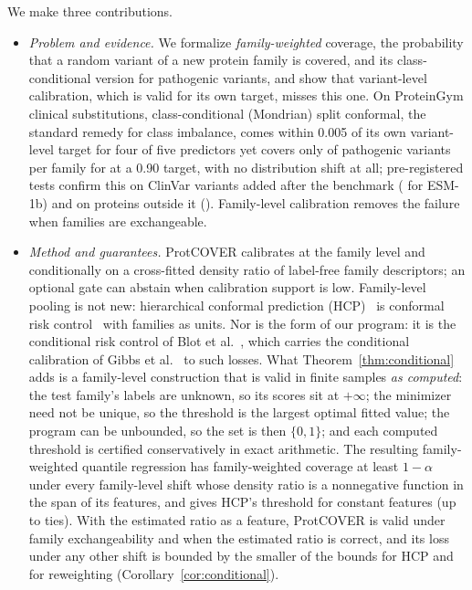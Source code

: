We make three contributions.
\begin{itemize}
\item \emph{Problem and evidence.} We formalize \emph{family-weighted} coverage, the probability that a random variant of a new protein family is covered, and its class-conditional version for pathogenic variants, and show that variant-level calibration, which is valid for its own target, misses this one. On ProteinGym clinical substitutions, class-conditional (Mondrian) split conformal, the standard remedy for class imbalance, comes within 0.005 of its own variant-level target for four of five predictors yet covers only \sOneBtwoPath{} of pathogenic variants per family for \sOneBtwoNBelow{} at a 0.90 target, with no distribution shift at all; pre-registered tests confirm this on ClinVar variants added after the benchmark (\extBtwoPath{} for ESM-1b) and on proteins outside it (\unsBtwoPath{}). Family-level calibration removes the failure when families are exchangeable.
\item \emph{Method and guarantees.} ProtCOVER calibrates at the family level and conditionally on a cross-fitted density ratio of label-free family descriptors; an optional gate can abstain when calibration support is low. Family-level pooling is not new: hierarchical conformal prediction (HCP)~\cite{lee2026hierarchical} is conformal risk control~\cite{angelopoulos2024conformal} with families as units. Nor is the form of our program: it is the conditional risk control of Blot et al.~\cite{blot2025automatically}, which carries the conditional calibration of Gibbs et al.~\cite{gibbs2025conformal} to such losses. What Theorem~\ref{thm:conditional} adds is a family-level construction that is valid in finite samples \emph{as computed}: the test family's labels are unknown, so its scores sit at $+\infty$; the minimizer need not be unique, so the threshold is the largest optimal fitted value; the program can be unbounded, so the set is then $\{0,1\}$; and each computed threshold is certified conservatively in exact arithmetic. The resulting family-weighted quantile regression has family-weighted coverage at least $1-\alpha$ under every family-level shift whose density ratio is a nonnegative function in the span of its features, and gives HCP's threshold for constant features (up to ties). With the estimated ratio as a feature, ProtCOVER is valid under family exchangeability and when the estimated ratio is correct, and its loss under any other shift is bounded by the smaller of the bounds for HCP and for reweighting (Corollary~\ref{cor:conditional}).

\end{itemize}
